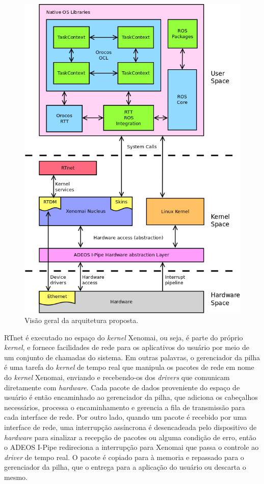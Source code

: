 \documentclass[conference]{IEEEtran}
\begin{document}
\begin{figure}[h]
	\centering
	\includegraphics[scale=0.33]{files/VILMA_ENV_OVERVIEW.png}
	\caption{Visão geral da arquitetura proposta.}
	\label{fig:vilma_env_overview}
\end{figure}

RTnet é executado no espaço do \textit{kernel} Xenomai, ou seja, é parte do próprio \textit{kernel}, e fornece facilidades de rede para os aplicativos do usuário por meio de um conjunto de chamadas do sistema. Em outras palavras, o gerenciador da pilha é uma tarefa do \textit{kernel} de tempo real que manipula os pacotes de rede em nome do \textit{kernel} Xenomai, enviando e recebendo-os dos \textit{drivers} que comunicam diretamente com \textit{hardware}. Cada pacote de dados proveniente do espaço de usuário é então encaminhado ao gerenciador da pilha, que adiciona os cabeçalhos necessários, processa o encaminhamento e gerencia a fila de transmissão para cada interface de rede. Por outro lado, quando um pacote é recebido por uma interface de rede, uma interrupção assíncrona é desencadeada pelo dispositivo de \textit{hardware} para sinalizar a recepção de pacotes ou alguma condição de erro, então o ADEOS I-Pipe redireciona a interrupção para Xenomai que passa o controle ao \textit{driver} de tempo real. O pacote é copiado para à memoria e repassado para o gerenciador da pilha, que o entrega para a aplicação do usuário ou descarta o mesmo.
\end{document}
